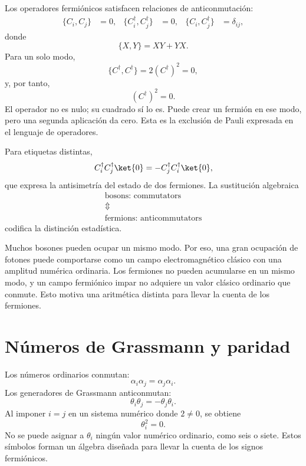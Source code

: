 Los operadores fermiónicos satisfacen relaciones de anticonmutación:
\begin{align}
\{C_i,C_j\}&=0,&
\{C_i^\dagger,C_j^\dagger\}&=0,&
\{C_i,C_j^\dagger\}&=\delta_{ij},
\end{align}
donde
\begin{equation}
\{X,Y\}=XY+YX.
\end{equation}
Para un solo modo,
\begin{equation}
\{C^\dagger,C^\dagger\}=2(C^\dagger)^2=0,
\end{equation}
y, por tanto,
\begin{equation}
(C^\dagger)^2=0.
\end{equation}
El operador no es nulo; su cuadrado sí lo es. Puede crear un fermión en ese modo, pero una segunda aplicación da cero. Esta es la exclusión de Pauli expresada en el lenguaje de operadores.

Para etiquetas distintas,
\begin{equation}
C_i^\dagger C_j^\dagger\ket{0}
=-C_j^\dagger C_i^\dagger\ket{0},
\end{equation}
que expresa la antisimetría del estado de dos fermiones. La sustitución algebraica
\begin{equation}
\begin{gathered}
\text{bosons: commutators}\\
\Updownarrow\\
\text{fermions: anticommutators}
\end{gathered}
\end{equation}
codifica la distinción estadística.

Muchos bosones pueden ocupar un mismo modo. Por eso, una gran ocupación de fotones puede comportarse como un campo electromagnético clásico con una amplitud numérica ordinaria. Los fermiones no pueden acumularse en un mismo modo, y un campo fermiónico impar no adquiere un valor clásico ordinario que conmute. Esto motiva una aritmética distinta para llevar la cuenta de los fermiones.

\section{Números de Grassmann y paridad}

Los números ordinarios conmutan:
\begin{equation}
\alpha_i\alpha_j=\alpha_j\alpha_i.
\end{equation}
Los generadores de Grassmann anticonmutan:
\begin{equation}
\theta_i\theta_j=-\theta_j\theta_i.
\end{equation}
Al imponer \(i=j\) en un sistema numérico donde \(2\neq0\), se obtiene
\begin{equation}
\theta_i^2=0.
\end{equation}
No se puede asignar a \(\theta_i\) ningún valor numérico ordinario, como seis o siete. Estos símbolos forman un álgebra diseñada para llevar la cuenta de los signos fermiónicos.

